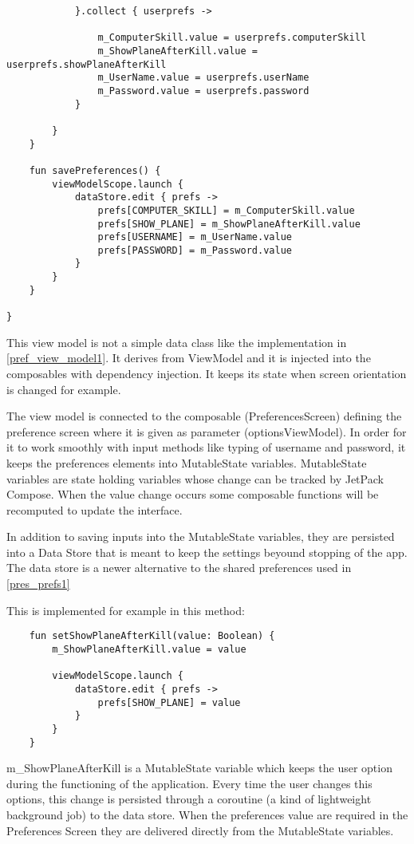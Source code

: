 \begin{lstlisting}
			}.collect { userprefs ->
				
				m_ComputerSkill.value = userprefs.computerSkill
				m_ShowPlaneAfterKill.value = userprefs.showPlaneAfterKill
				m_UserName.value = userprefs.userName
				m_Password.value = userprefs.password
			}
			
		}
	}
	
	fun savePreferences() {
		viewModelScope.launch {
			dataStore.edit { prefs ->
				prefs[COMPUTER_SKILL] = m_ComputerSkill.value
				prefs[SHOW_PLANE] = m_ShowPlaneAfterKill.value
				prefs[USERNAME] = m_UserName.value
				prefs[PASSWORD] = m_Password.value
			}
		}
	}
	
}
\end{lstlisting}

This view model is not a simple data class like the implementation in \ref{pref_view_model1}. It derives from ViewModel and it is injected into the composables with dependency injection. It keeps its state when screen orientation is changed for example. 

The view model is connected to the composable (PreferencesScreen) defining the preference screen where it is given as parameter (optionsViewModel). In order for it to work smoothly with input methods like typing of username and password, it keeps the preferences elements into MutableState variables. MutableState variables are state holding variables whose change can be tracked by JetPack Compose. When the value change occurs some composable functions will be recomputed to update the interface.

In addition to saving inputs into the MutableState variables, they are persisted into a Data Store that is meant to keep the settings beyound stopping of the app. The data store is a newer alternative to the shared preferences used in \ref{pres_prefs1}

This is implemented for example in this method:

\begin{lstlisting}
	fun setShowPlaneAfterKill(value: Boolean) {
		m_ShowPlaneAfterKill.value = value
		
		viewModelScope.launch {
			dataStore.edit { prefs ->
				prefs[SHOW_PLANE] = value
			}
		}
	}
\end{lstlisting}

m\_ShowPlaneAfterKill is a MutableState variable which keeps the user option during the functioning of the application. Every time the user changes this options, this change is persisted through a coroutine (a kind of lightweight background job) to the data store. When the preferences value are required in the Preferences Screen they are delivered directly from the MutableState variables.

